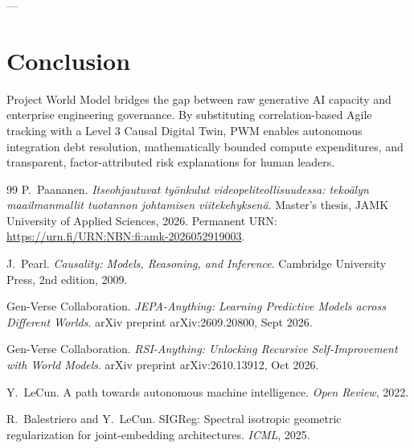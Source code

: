 \documentclass[11pt,a4paper]{article}
\begin{document}
---

\section{Conclusion}
Project World Model bridges the gap between raw generative AI capacity and enterprise engineering governance. By substituting correlation-based Agile tracking with a Level 3 Causal Digital Twin, PWM enables autonomous integration debt resolution, mathematically bounded compute expenditures, and transparent, factor-attributed risk explanations for human leaders.


\begin{thebibliography}{99}
P.~Paananen.
\newblock \emph{Itseohjautuvat ty\"onkulut videopeliteollisuudessa: teko\"alyn maailmanmallit tuotannon johtamisen viitekehyksen\"a}.
\newblock Master's thesis, JAMK University of Applied Sciences, 2026.
\newblock Permanent URN: \url{https://urn.fi/URN:NBN:fi:amk-2026052919003}.

J.~Pearl.
\newblock \emph{Causality: Models, Reasoning, and Inference}.
\newblock Cambridge University Press, 2nd edition, 2009.

Gen-Verse Collaboration.
\newblock \emph{JEPA-Anything: Learning Predictive Models across Different Worlds}.
\newblock arXiv preprint arXiv:2609.20800, Sept 2026.

Gen-Verse Collaboration.
\newblock \emph{RSI-Anything: Unlocking Recursive Self-Improvement with World Models}.
\newblock arXiv preprint arXiv:2610.13912, Oct 2026.

Y.~LeCun.
\newblock A path towards autonomous machine intelligence.
\newblock \emph{Open Review}, 2022.

R.~Balestriero and Y.~LeCun.
\newblock SIGReg: Spectral isotropic geometric regularization for joint-embedding architectures.
\newblock \emph{ICML}, 2025.
\end{thebibliography}
\end{document}
